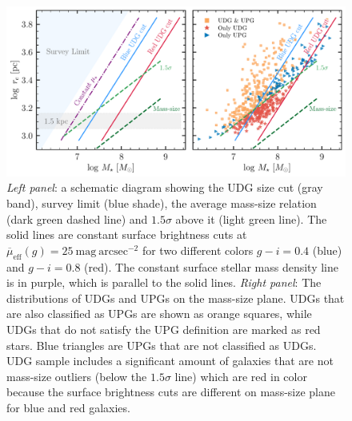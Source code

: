 \documentclass[twocolumn,astrosymb,twocolappendix]{aastex631}
\newcommand{\sbunit}{\mathrm{mag\ arcsec}^{-2}}
\newcommand{\sbeff}{\overline{\mu}_{\mathrm{eff}}(g)}
\begin{document}
\begin{CJK*}{UTF8}{gbsn}
\begin{figure}
	\vbox{ 
		\centering
		\includegraphics[width=1\linewidth]{mass_size_plane_new.pdf}
	}
    \caption{\textit{Left panel}: a schematic diagram showing the UDG size cut (gray band), survey limit (blue shade), the average mass-size relation (dark green dashed line) and $1.5\sigma$ above it (light green line). The solid lines are constant surface brightness cuts at $\sbeff=25\ \sbunit$ for two different colors $g-i=0.4$ (blue) and $g-i=0.8$ (red). The constant surface stellar mass density line is in purple, which is parallel to the solid lines. \textit{Right panel}: The distributions of UDGs and UPGs on the mass-size plane. UDGs that are also classified as UPGs are shown as orange squares, while UDGs that do not satisfy the UPG definition are marked as red stars. Blue triangles are UPGs that are not classified as UDGs. UDG sample includes a significant amount of galaxies that are not mass-size outliers (below the $1.5\sigma$ line) which are red in color because the surface brightness cuts are different on mass-size plane for blue and red galaxies.
    }
    \label{fig:mass_size}
\end{figure}


\end{CJK*}
\end{document}
